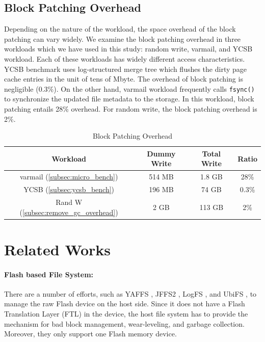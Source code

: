 \documentclass[prodmode,acmtecs]{acmsmall}
\begin{document}
\subsection{Block Patching Overhead}
\label{subsec:patching_overhead_test}

Depending on the nature of the workload, the space overhead of the
block patching can vary widely. We examine the block patching overhead
in three workloads which we have used in this study: random write,
varmail, and YCSB workload. Each of these workloads has widely
different access characteristics. YCSB benchmark uses log-structured
merge tree which flushes the dirty page cache entries in the unit of
tens of Mbyte. The overhead of block patching is negligible (0.3\%).
On the other hand, varmail workload frequently calls \texttt{fsync()}
to synchronize the updated file metadata to the storage. In this
workload, block patching entails 28\% overhead. For random write, the
block patching overhead is 2\%.

\begin{table}[t]
  \begin{center}
  \begin{tabular}{|c|c|c|c|} \hline
  Workload 							& Dummy Write	& Total Write	& Ratio 		\\ \hline\hline
  varmail	 (\cref{subsec:micro_bench})	& 514 MB		& 1.8 GB		& 28\%	\\ \hline
  YCSB (\cref{subsec:ycsb_bench})		& 196 MB		& 74 GB		& 0.3\%	\\ \hline
  Rand W (\cref{subsec:remove_gc_overhead}) & 2 GB		& 113 GB		& 2\%	\\ \hline
  \end{tabular}
  \end{center}
  \caption{Block Patching Overhead}
  \label{tab:block_patching}
\end{table}


\section{Related Works}
\label{sec:related_works}

\paragraph{Flash based File System: }
There are a number of efforts, such as YAFFS \cite{manning2010yaffs},
JFFS2 \cite{zhang2006implementation}, LogFS \cite{engel2005logfs}, and
UbiFS \cite{hunter2008brief}, to manage the raw Flash device on the
host side.  Since it does not have a Flash Translation Layer (FTL) in
the device, the host file system has to provide the mechanism for bad
block management, wear-leveling, and garbage collection. Moreover,
they only support one Flash memory device. 
\end{document}
